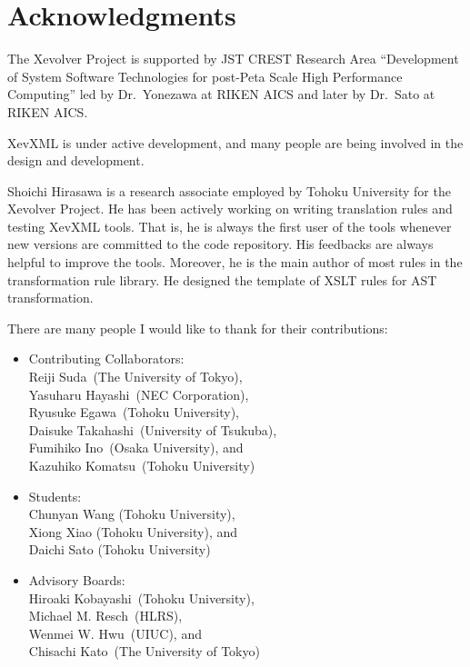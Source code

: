\chapter*{Acknowledgments}

The Xevolver Project is supported by JST CREST Research Area
``Development of System Software Technologies for post-Peta Scale High
Performance Computing'' led by Dr.~Yonezawa at RIKEN AICS and later by
Dr.~Sato at RIKEN AICS.

XevXML is under active development, and many people are being involved
in the design and development.

Shoichi Hirasawa is a research associate employed by Tohoku University
for the Xevolver Project.  He has been actively working on writing
translation rules and testing XevXML tools. That is, he is always the
first user of the tools whenever new versions are committed to the code
repository.  His feedbacks are always helpful to improve the
tools. Moreover, he is the main author of most rules in the
transformation rule library. He designed the template of XSLT rules for
AST transformation.

There are many people I would like to thank for their contributions:
\begin{itemize}
 \item Contributing Collaborators: \\
       Reiji Suda~(The University of Tokyo),\\
       Yasuharu Hayashi~(NEC Corporation),\\
       Ryusuke Egawa~(Tohoku University),\\
       Daisuke Takahashi~(University of Tsukuba), \\
       Fumihiko Ino~(Osaka University), and \\
       Kazuhiko Komatsu~(Tohoku University)

 \item Students: \\
       Chunyan Wang (Tohoku University),\\
       Xiong Xiao (Tohoku University), and \\
       Daichi Sato (Tohoku University)

 \item Advisory Boards:\\
       Hiroaki Kobayashi~(Tohoku University),\\
       Michael M. Resch~(HLRS),\\
       Wenmei W. Hwu~(UIUC), and\\
       Chisachi Kato~(The University of Tokyo)
\end{itemize}

